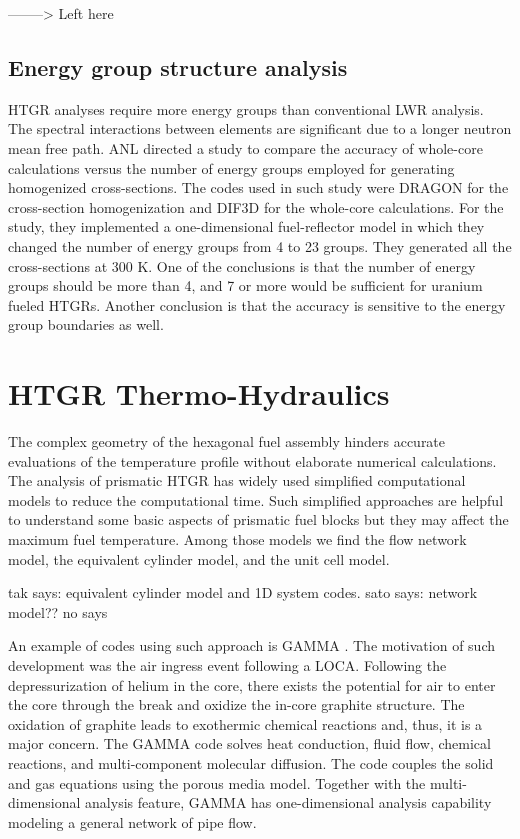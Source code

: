 \documentclass[11pt,letterpaper]{article}
\begin{document}
--------> Left here




\subsection{Energy group structure analysis}

\gls{HTGR} analyses require more energy groups than conventional \gls{LWR} analysis.
The spectral interactions between elements are significant due to a longer neutron mean free path.
\gls{ANL} directed a study \cite{lee_status_2006} to compare the accuracy of whole-core calculations versus the number of energy groups employed for generating homogenized cross-sections.
The codes used in such study were DRAGON for the cross-section homogenization and DIF3D for the whole-core calculations.
For the study, they implemented a one-dimensional fuel-reflector model in which they changed the number of energy groups from 4 to 23 groups.
They generated all the cross-sections at 300 K.
One of the conclusions is that the number of energy groups should be more than 4, and 7 or more would be sufficient for uranium fueled \glspl{HTGR}.
Another conclusion is that the accuracy is sensitive to the energy group boundaries as well.


\section{HTGR Thermo-Hydraulics}

The complex geometry of the hexagonal fuel assembly hinders accurate evaluations of the temperature profile without elaborate numerical calculations.
The analysis of prismatic \gls{HTGR} has widely used simplified computational models to reduce the computational time.
Such simplified approaches are helpful to understand some basic aspects of prismatic fuel blocks but they may affect the maximum fuel temperature.
Among those models we find the flow network model, the equivalent cylinder model, and the unit cell model.


tak says: equivalent cylinder model and 1D system codes.
sato says: network model??
no says


An example of codes using such approach is GAMMA \cite{no_multi-component_2007}.
The motivation of such development was the air ingress event following a LOCA.
Following the depressurization of helium in the core, there exists the potential for air to enter the core through the break and oxidize the in-core graphite structure.
The oxidation of graphite leads to exothermic chemical reactions and, thus, it is a major concern.
The GAMMA code solves heat conduction, fluid flow, chemical reactions, and multi-component molecular diffusion.
The code couples the solid and gas equations using the porous media model.
Together with the multi-dimensional analysis feature, GAMMA has one-dimensional analysis capability modeling a general network of pipe flow.
\end{document}
